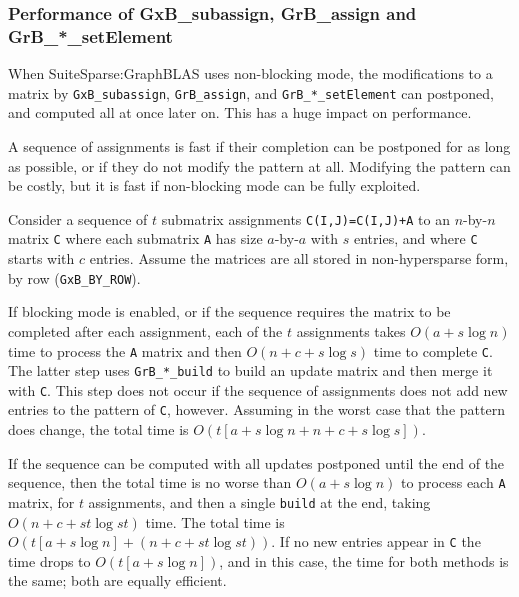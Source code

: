 \documentclass[12pt]{article}
\begin{document}
{\newpage
\subsubsection{Performance of {\sf GxB\_subassign}, {\sf GrB\_assign}
and {\sf GrB\_*\_setElement}}

When SuiteSparse:GraphBLAS uses non-blocking mode, the modifications to a
matrix by \verb'GxB_subassign', \verb'GrB_assign', and \verb'GrB_*_setElement'
can postponed, and computed all at once later on.  This has a huge impact on
performance.

A sequence of assignments is fast if their completion can be postponed for as
long as possible, or if they do not modify the pattern at all.  Modifying the
pattern can be costly, but it is fast if non-blocking mode can be fully
exploited.

Consider a sequence of $t$ submatrix assignments \verb'C(I,J)=C(I,J)+A' to an
$n$-by-$n$ matrix \verb'C' where each submatrix \verb'A' has size $a$-by-$a$
with $s$ entries, and where \verb'C' starts with $c$ entries.
Assume the matrices are all stored in non-hypersparse form, by row
(\verb'GxB_BY_ROW').

If blocking mode is enabled, or if the sequence requires the matrix to be
completed after each assignment, each of the $t$ assignments takes $O(a + s
\log n)$ time to process the \verb'A' matrix and then $O(n + c + s \log s)$
time to complete \verb'C'.  The latter step uses \verb'GrB_*_build' to build an
update matrix and then merge it with \verb'C'.  This step does not occur if the
sequence of assignments does not add new entries to the pattern of \verb'C',
however.  Assuming in the worst case that the pattern does change, the total
time is $O (t \left[ a + s \log n + n + c + s \log s \right] )$.

If the sequence can be computed with all updates postponed until the end of the
sequence, then the total time is no worse than $O(a + s \log n)$ to process
each \verb'A' matrix, for $t$ assignments, and then a single \verb'build' at
the end, taking $O(n + c + st \log st)$ time.
The total time is $O (t \left [a + s \log n \right] + (n + c + st \log st))$.
If no new entries appear in
\verb'C' the time drops to $O (t \left [a + s \log n \right])$, and in this
case, the time for both methods is the same; both are equally efficient.

}
\end{document}
